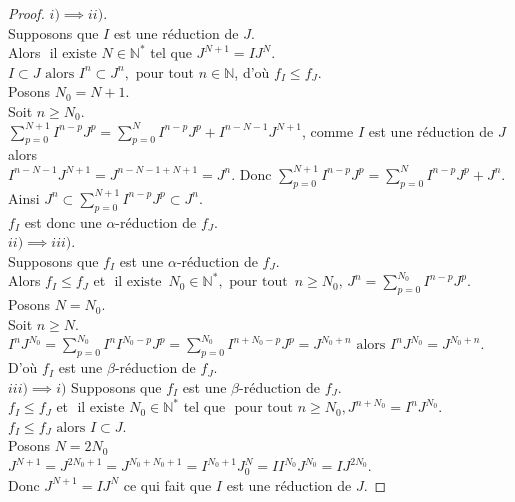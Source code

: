 \begin{proof}
	$i) \implies ii)$.\\
	Supposons que $I$ est une réduction de $J$.\\
	Alors $\text{ il existe } N \in \mathbb{N^*}$ tel que $J^{N+1} = IJ^N$.\\ $I \subset J \text{ alors } I^n \subset J^n , \text{ pour tout } n \in \mathbb{N}$, d'où $f_I \leq f_J$.\\
	Posons $N_0 = N+1$.\\
	Soit $n \geq N_0$.\\
	$\displaystyle \sum_{p=0}^{N+1}{I^{n-p} J^{p}} = \displaystyle \sum_{p=0}^{N}{I^{n-p} J^{p}} + I^{n-N-1} J^{N+1}$, comme $I$ est une réduction de $J$ alors\\ $I^{n-N-1} J^{N+1} = J^{n-N-1+N+1} = J^n$. Donc $\displaystyle \sum_{p=0}^{N+1}{I^{n-p} J^{p}} = \displaystyle \sum_{p=0}^{N}{I^{n-p} J^{p}} + J^{n}$.\\ Ainsi $J^n \subset \displaystyle \sum_{p=0}^{N+1}{I^{n-p} J^{p}} \subset J^n$.\\
	$f_I$ est donc une $\alpha$-réduction de $f_J$.\\
	$ii) \implies iii)$.\\
	Supposons que $f_I$ est une $\alpha$-réduction de $f_J$.\\
	Alors $f_I \leq f_J$ et $\text{ il existe } \, N_0 \in \mathbb{N^*} , \text{ pour tout } \, n \geq N_0, \, J^n = \displaystyle \sum_{p=0}^{N_0}{I^{n-p} J^{p}}$.\\
	Posons $N = N_0$.\\
	Soit $n \geq N$. \\
	$I^n J^{N_0} = \displaystyle \sum_{p=0}^{N_0}{I^n I^{N_0-p} J^{p}} = \displaystyle \sum_{p=0}^{N_0}{I^{n+N_0-p} J^{p}} = J^{N_0+n} \text{ alors } I^n J^{N_0} = J^{N_0+n}$.\\D'où $f_I$ est une $\beta$-réduction de $f_J$.\\
	$iii) \implies i)$
	Supposons que $f_I$ est une $\beta$-réduction de $f_J$.\\
	$f_I \leq f_J$ et $\text{ il existe } N_0 \in \mathbb{N^*}$ tel que $\text{ pour tout } n \geq N_0 , J^{n+N_0} = I^n J^{N_0}$.\\
	$f_I \leq f_J \text{ alors } I \subset J$.\\
	Posons $N = 2N_0$\\
	$J^{N+1} = J^{2N_0+1} = J^{N_0+N_0+1} = I^{N_0+1} J^N_0 = I I^{N_0} J^{N_0} = IJ^{2N_0}$.\\ Donc $J^{N+1}= IJ^{N}$ ce qui fait que $I$ est une réduction de $J$.
\end{proof}
